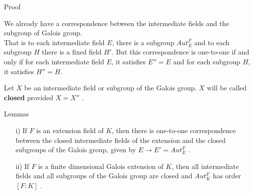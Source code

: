 \documentclass{beamer}
\begin{document}
\begin{frame}{Proof}
  \begin{tcolorbox}[colframe=blue!40, boxsep=2mm]
  We already have a correspondence between the intermediate fields and the subgroup of Galois group.\\
  That is to each intermediate field \(E\), there is a subgroup \(Aut_E^F\) and to each subgroup \(H\) there is a fixed field \(H'\). But this correspondence is one-to-one if and only if for each intermediate field \(E\), it satisfies \(E''=E\) and for each subgroup \(H\), it satisfies \(H''=H\).
\end{tcolorbox}
\vspace{3mm}

\begin{tcolorbox}[colframe=blue!40, boxsep=1mm]
  \begin{definition}
    Let \(X\) be an intermediate field or subgroup of the Galois group. \(X\) will be called \textbf{closed} provided \(X=X''\) \cite{hunger}.
  \end{definition}
\end{tcolorbox}
\end{frame}

\begin{frame}{Lemmas}
  \begin{tcolorbox}[colframe=blue!40, boxsep=1mm]
    \begin{lemma}
      \begin{enumerate}
      \item[i)] If \(F\) is an extension field of \(K\), then there is one-to-one correspondence between the closed intermediate fields of the extension and the closed subgroups of the Galois group, given by \(E \rightarrow E' =  Aut_E^F\) \cite{hunger}.

      \item[ii)] If \(F\) is a finite dimensional Galois extension of \(K\), then all intermediate fields and all subgroups of the Galois group are closed and \(Aut_K^F\) has order \([F:K]\) \cite{hunger}.
      \end{enumerate}
    \end{lemma}
  \end{tcolorbox}
\end{frame}
\end{document}
